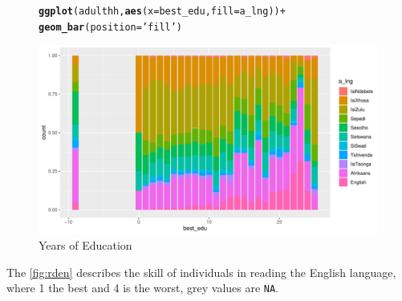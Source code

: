 \documentclass[a4paper,british]{article}\usepackage[]{graphicx}\usepackage[]{xcolor}
\makeatletter
\def\maxwidth{ %
  \ifdim\Gin@nat@width>\linewidth
    \linewidth
  \else
    \Gin@nat@width
  \fi
}
\newcommand{\hlstr}[1]{\textcolor[rgb]{0.192,0.494,0.8}{#1}}%
\newcommand{\hlopt}[1]{\textcolor[rgb]{0,0,0}{#1}}%
\newcommand{\hlstd}[1]{\textcolor[rgb]{0.345,0.345,0.345}{#1}}%
\newcommand{\hlkwc}[1]{\textcolor[rgb]{0.333,0.667,0.333}{#1}}%
\newcommand{\hlkwd}[1]{\textcolor[rgb]{0.737,0.353,0.396}{\textbf{#1}}}%
\newenvironment{kframe}{%
 \def\at@end@of@kframe{}%
 \ifinner\ifhmode%
  \def\at@end@of@kframe{\end{minipage}}%
  \begin{minipage}{\columnwidth}%
 \fi\fi%
 \def\FrameCommand##1{\hskip\@totalleftmargin \hskip-\fboxsep
 \colorbox{shadecolor}{##1}\hskip-\fboxsep
     \hskip-\linewidth \hskip-\@totalleftmargin \hskip\columnwidth}%
 \MakeFramed {\advance\hsize-\width
   \@totalleftmargin\z@ \linewidth\hsize
   \@setminipage}}%
 {\par\unskip\endMakeFramed%
 \at@end@of@kframe}
\newenvironment{knitrout}{}{} %
\providecommand*{\code}[1]{\texttt{#1}}
\let\ref\autoref
\makeatother
\begin{document}
\begin{figure}[H]
\caption{Years of Education}

\label{fig:bestedu}

\begin{knitrout}
\color{fgcolor}\begin{kframe}
\begin{alltt}
\hlkwd{ggplot}\hlstd{(adulthh,} \hlkwd{aes}\hlstd{(}\hlkwc{x}\hlstd{=best_edu,} \hlkwc{fill}\hlstd{=a_lng ))} \hlopt{+}
    \hlkwd{geom_bar}\hlstd{(}\hlkwc{position} \hlstd{=} \hlstr{'fill'}\hlstd{)}
\end{alltt}
\end{kframe}
\includegraphics[width=\maxwidth]{../misc/latex-best_edu-1} 
\end{knitrout}
\end{figure}

The \ref{fig:rden} describes the skill of individuals in reading
the English language, where 1 the best and 4 is the worst, grey values
are \code{NA}.
\end{document}
